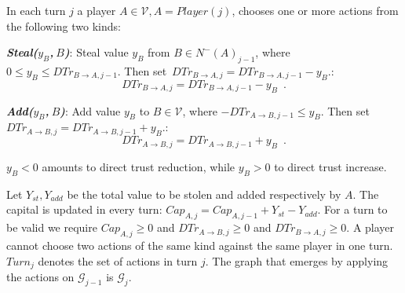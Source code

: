 \begin{definition}[Turns]
  In each turn $j$ a player $A \in \mathcal{V}, A = Player\left(j\right)$, chooses one or more actions from the following two
  kinds:

  \noindent \textit{\textbf{Steal($y_B$,$\:B$)}}: Steal value $y_B$ from $B \in N^{-}\left(A\right)_{j-1}$, where
  $0 \leq y_B \leq DTr_{B \rightarrow A, j-1}$. Then set\ifdefined\proceedings \ $DTr_{B \rightarrow A, j} = DTr_{B
  \rightarrow A, j-1} - y_B$.\else:
  \begin{equation*}
    DTr_{B \rightarrow A, j} = DTr_{B \rightarrow A, j-1} - y_B \enspace.
  \end{equation*}\fi

  \noindent \textit{\textbf{Add($y_B$,$\:B$)}}: Add value $y_B$ to $B \in \mathcal{V}$, where
  $-DTr_{A \rightarrow B, j-1} \leq y_B$. Then set\ifdefined\proceedings \ $DTr_{A \rightarrow B, j} = DTr_{A \rightarrow B,
  j-1} + y_B$.\else:
  \begin{equation*}
    DTr_{A \rightarrow B, j} = DTr_{A \rightarrow B, j-1} + y_B \enspace.
  \end{equation*}\fi

  $y_B < 0$ amounts to direct trust reduction, while $y_B > 0$ to direct trust increase.

  Let $Y_{st}, Y_{add}$ be the total value to be stolen and added respectively by $A$.  The capital is updated in every turn:
  $Cap_{A, j} = Cap_{A, j-1} + Y_{st} - Y_{add}$. For a turn to be valid we require $Cap_{A, j} \geq 0$ and $DTr_{A
  \rightarrow B, j} \geq 0$ and $DTr_{B \rightarrow A, j} \geq 0$. A player cannot choose two actions of the same kind against
  the same player in one turn. $Turn_j$ denotes the set of actions in turn $j$. The graph that emerges by applying the actions
  on $\mathcal{G}_{j-1}$ is $\mathcal{G}_j$.
\end{definition}
